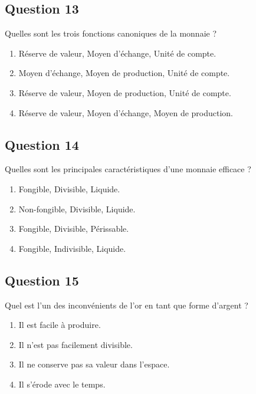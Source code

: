 \documentclass[12pt,a4paper]{article}
\begin{document}
\bigskip


\subsection*{Question 13}
Quelles sont les trois fonctions canoniques de la monnaie ?

\begin{enumerate}[label=\Alph*., leftmargin=*]
\item Réserve de valeur, Moyen d'échange, Unité de compte.
\item Moyen d'échange, Moyen de production, Unité de compte.
\item Réserve de valeur, Moyen de production, Unité de compte.
\item Réserve de valeur, Moyen d'échange, Moyen de production.
\end{enumerate}

\bigskip


\subsection*{Question 14}
Quelles sont les principales caractéristiques d'une monnaie efficace ?

\begin{enumerate}[label=\Alph*., leftmargin=*]
\item Fongible, Divisible, Liquide.
\item Non-fongible, Divisible, Liquide.
\item Fongible, Divisible, Périssable.
\item Fongible, Indivisible, Liquide.
\end{enumerate}

\bigskip


\subsection*{Question 15}
Quel est l'un des inconvénients de l'or en tant que forme d'argent ?

\begin{enumerate}[label=\Alph*., leftmargin=*]
\item Il est facile à produire.
\item Il n'est pas facilement divisible.
\item Il ne conserve pas sa valeur dans l'espace.
\item Il s'érode avec le temps.
\end{enumerate}
\end{document}
